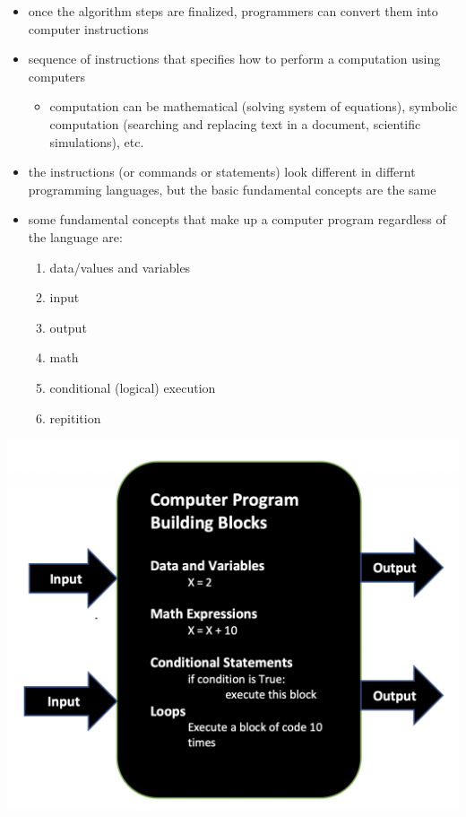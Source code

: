 \documentclass[11pt]{article}
\providecommand{\tightlist}{%
      \setlength{\itemsep}{0pt}\setlength{\parskip}{0pt}}
\begin{document}
\begin{itemize}
\tightlist
\item
  once the algorithm steps are finalized, programmers can convert them
  into computer instructions
\item
  sequence of instructions that specifies how to perform a computation
  using computers

  \begin{itemize}
  \tightlist
  \item
    computation can be mathematical (solving system of equations),
    symbolic computation (searching and replacing text in a document,
    scientific simulations), etc.
  \end{itemize}
\item
  the instructions (or commands or statements) look different in
  differnt programming languages, but the basic fundamental concepts are
  the same
\item
  some fundamental concepts that make up a computer program regardless
  of the language are:

  \begin{enumerate}
  \def\labelenumi{\arabic{enumi}.}
  \tightlist
  \item
    data/values and variables
  \item
    input
  \item
    output
  \item
    math
  \item
    conditional (logical) execution
  \item
    repitition
  \end{enumerate}
\end{itemize}

\includegraphics{resources/BuildingBlocks.png}
\end{document}
